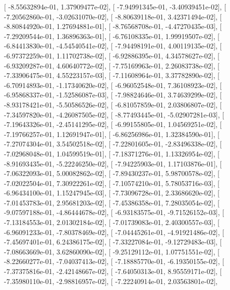\documentclass{article}
\begin{document}
       [ -8.55632894e-01,   1.37909477e-02],
       [ -7.94991345e-01,  -3.40939451e-02],
       [ -7.20562860e-01,  -3.02631070e-02],
       [ -8.80639118e-01,   3.42371494e-02],
       [ -8.80844920e-01,   1.27694881e-01],
       [ -8.76568708e-01,  -4.47270435e-03],
       [ -7.29209544e-01,   1.36896363e-01],
       [ -6.76108335e-01,   1.99919507e-02],
       [ -6.84413830e-01,  -4.54540541e-02],
       [ -7.94498191e-01,   4.00119135e-02],
       [ -6.97372259e-01,   1.11702738e-02],
       [ -6.92886395e-01,   4.34578627e-02],
       [ -6.93209287e-01,   4.60640772e-02],
       [ -7.75169963e-01,   2.26083738e-02],
       [ -7.33906475e-01,   4.55223157e-03],
       [ -7.11608964e-01,   3.37782890e-02],
       [ -6.70914893e-01,  -1.17340620e-02],
       [ -6.96052548e-01,   7.36108923e-02],
       [ -6.95868337e-01,  -1.52586087e-03],
       [ -7.98824646e-01,   3.74639299e-02],
       [ -8.93178421e-01,  -5.50586526e-02],
       [ -6.81057859e-01,   2.03806807e-02],
       [ -7.34597820e-01,  -4.26087505e-02],
       [ -8.77493445e-01,  -5.02907281e-03],
       [ -7.19643326e-01,  -2.45141295e-02],
       [ -6.99155805e-01,   1.04569251e-02],
       [ -7.19766257e-01,   1.12691947e-01],
       [ -6.86256986e-01,   1.32384590e-01],
       [ -7.27074304e-01,   3.54502518e-02],
       [ -7.22801605e-01,  -2.83496338e-02],
       [ -7.02968048e-01,   1.04599519e-01],
       [ -7.18371276e-01,   1.13326954e-02],
       [ -8.91693435e-01,  -5.22246250e-02],
       [ -7.94225903e-01,   1.17103876e-01],
       [ -7.06322093e-01,   5.00082862e-02],
       [ -7.89430237e-01,   5.98700578e-02],
       [ -7.02022504e-01,   7.30922261e-02],
       [ -7.10574210e-01,   5.78053716e-03],
       [ -6.96434100e-01,   1.15247945e-03],
       [ -7.73096728e-01,   2.33686620e-02],
       [ -7.01453783e-01,   2.95681203e-02],
       [ -7.45386358e-01,   7.28035054e-02],
       [ -9.07597188e-01,  -4.86444678e-02],
       [ -6.93183575e-01,  -9.71526152e-03],
       [ -7.13184553e-01,   2.01302184e-02],
       [ -7.01739083e-01,   2.40300557e-03],
       [ -6.96091233e-01,  -7.80378469e-02],
       [ -7.04445261e-01,  -4.91921486e-02],
       [ -7.45697401e-01,   6.24386175e-02],
       [ -7.33227084e-01,  -9.12729483e-03],
       [ -7.08663669e-01,   3.62860090e-02],
       [ -9.25129112e-01,   1.07751551e-02],
       [ -8.22660277e-01,  -7.04037413e-02],
       [ -7.18885770e-01,  -6.19350155e-02],
       [ -7.37375816e-01,  -2.42148667e-02],
       [ -7.64050313e-01,   8.95559171e-02],
       [ -7.35980110e-01,  -2.98816957e-02],
       [ -7.22240914e-01,   2.03563801e-02],
\end{document}
